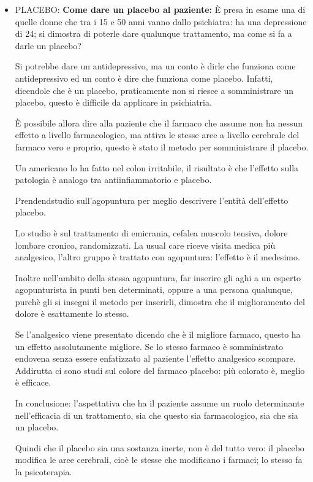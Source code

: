 \documentclass[]{article}
\begin{document}
\begin{itemize}
\item
  PLACEBO: \textbf{Come dare un placebo al paziente:} È presa in esame
  una di quelle donne che tra i 15 e 50 anni vanno dallo psichiatra: ha
  una depressione di 24; si dimostra di poterle dare qualunque
  trattamento, ma come si fa a darle un placebo?

  Si potrebbe dare un antidepressivo, ma un conto è dirle che funziona
  come antidepressivo ed un conto è dire che funziona come placebo.
  Infatti, dicendole che è un placebo, praticamente non si riesce a
  somministrare un placebo, questo è difficile da applicare in
  psichiatria.

  È possibile allora dire alla paziente che il farmaco che assume non ha
  nessun effetto a livello farmacologico, ma attiva le stesse aree a
  livello cerebrale del farmaco vero e proprio, questo è stato il metodo
  per somministrare il placebo.

  Un americano lo ha fatto nel colon irritabile, il risultato è che
  l'effetto sulla patologia è analogo tra antiinfiammatorio e placebo.

  Prendendstudio sull'agopuntura per meglio descrivere l'entità
  dell'effetto placebo.

  Lo studio è sul trattamento di emicrania, cefalea muscolo tensiva,
  dolore lombare cronico, randomizzati. La usual care riceve visita
  medica più analgesico, l'altro gruppo è trattato con agopuntura:
  l'effetto è il medesimo.

  Inoltre nell'ambito della stessa agopuntura, far inserire gli aghi a
  un esperto agopunturista in punti ben determinati, oppure a una
  persona qualunque, purchè gli si insegni il metodo per inserirli,
  dimostra che il miglioramento del dolore è esattamente lo stesso.

  Se l'analgesico viene presentato dicendo che è il migliore farmaco,
  questo ha un effetto assolutamente migliore. Se lo stesso farmaco è
  somministrato endovena senza essere enfatizzato al paziente l'effetto
  analgesico scompare. Addirutta ci sono studi sul colore del farmaco
  placebo: più colorato è, meglio è efficace.

  In conclusione: l'aspettativa che ha il paziente assume un ruolo
  determinante nell'efficacia di un trattamento, sia che questo sia
  farmacologico, sia che sia un placebo.

  Quindi che il placebo sia una sostanza inerte, non è del tutto vero:
  il placebo modifica le aree cerebrali, cioè le stesse che modificano i
  farmaci; lo stesso fa la psicoterapia.
\end{itemize}
\end{document}
